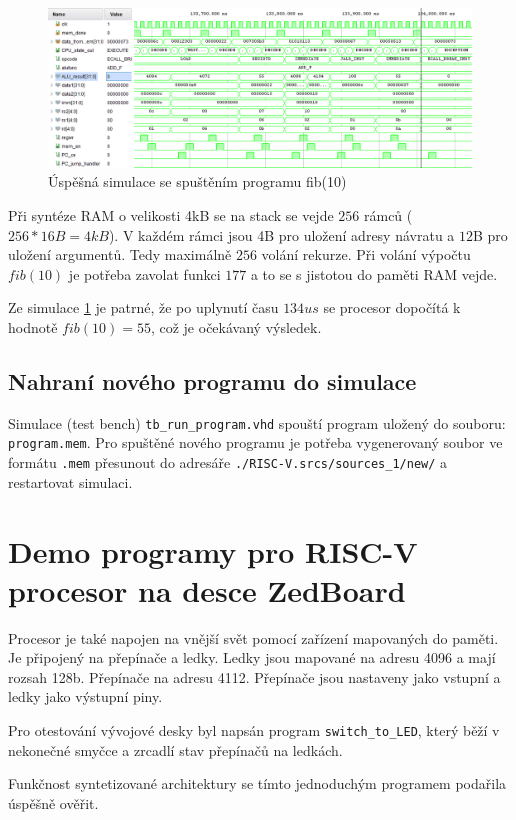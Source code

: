 \documentclass[FM,BP]{tulthesis}
\begin{document}
\begin{figure}[h]
    \centering
    \includegraphics[width=\textwidth]{assets/Program_fib(10).png}
    \caption{Úspěšná simulace se spuštěním programu fib(10)}
    \label{img:fib_simulace}
\end{figure}

Při syntéze RAM o velikosti 4kB se na stack se vejde $256$ rámců ($256 * 16B = 4kB$). V každém rámci jsou 4B pro uložení adresy návratu a $12$B pro uložení argumentů. Tedy maximálně $256$ volání rekurze. Při volání výpočtu $fib(10)$ je potřeba zavolat funkci $177$ a to se s jistotou do paměti RAM vejde.

Ze simulace \ref{img:fib_simulace} je patrné, že po uplynutí času $134 us$ se procesor dopočítá k hodnotě $fib(10) = 55$, což je očekávaný výsledek. 

\subsection{Nahraní nového programu do simulace}
Simulace (test bench) \verb|tb_run_program.vhd| spouští program uložený do souboru: \verb|program.mem|. Pro spuštěné nového programu je potřeba vygenerovaný soubor ve formátu \verb|.mem| přesunout do adresáře \verb|./RISC-V.srcs/sources_1/new/| a restartovat simulaci.

\section{Demo programy pro RISC-V procesor na desce ZedBoard}
Procesor je také napojen na vnější svět pomocí zařízení mapovaných do paměti. Je připojený na přepínače a ledky. Ledky jsou mapované na adresu 4096 a mají rozsah 128b. Přepínače na adresu 4112. Přepínače jsou nastaveny jako vstupní a ledky jako výstupní piny. 

Pro otestování vývojové desky byl napsán program \verb|switch_to_LED|, který běží v nekonečné smyčce a zrcadlí stav přepínačů na ledkách.

Funkčnost syntetizované architektury se tímto jednoduchým programem podařila úspěšně ověřit.
\end{document}
